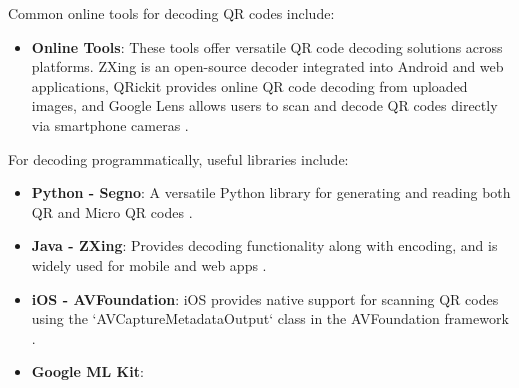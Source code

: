 Common online tools for decoding QR codes include:
\begin{itemize}
	\item \textbf{Online Tools}: These tools offer versatile QR code decoding solutions across platforms. ZXing is an open-source decoder integrated into Android and web applications, QRickit provides online QR code decoding from uploaded images, and Google Lens allows users to scan and decode QR codes directly via smartphone cameras \cite{ZXing2024, QRickit2024}.
	
\end{itemize}

For decoding programmatically, useful libraries include:
\begin{itemize}
	\item \textbf{Python - Segno}: A versatile Python library for generating and reading both QR and Micro QR codes \cite{Segno2024}.
	\item \textbf{Java - ZXing}: Provides decoding functionality along with encoding, and is widely used for mobile and web apps \cite{ZXing2024}.
	\item \textbf{iOS - AVFoundation}: iOS provides native support for scanning QR codes using the `AVCaptureMetadataOutput` class in the AVFoundation framework \cite{AVFoundation2024}.
	\item \textbf{Google ML Kit}: 
\end{itemize}
 
